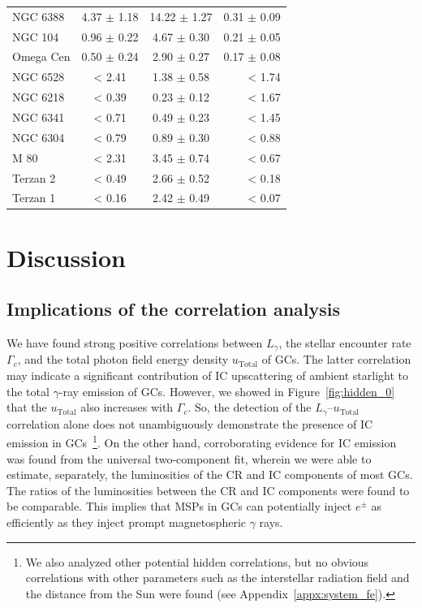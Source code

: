 \documentclass[doublespace,draft,nopageskip]{VTthesis} %
\begin{document}
\begin{table}
\begin{tabular}{lccr}
NGC 6388 & 4.37 $\pm$ 1.18 & 14.22 $\pm$ 1.27 & 0.31 $\pm$ 0.09 \\
NGC 104 & 0.96 $\pm$ 0.22 & 4.67 $\pm$ 0.30 & 0.21 $\pm$ 0.05 \\
Omega Cen & 0.50 $\pm$ 0.24 & 2.90 $\pm$ 0.27 & 0.17 $\pm$ 0.08 \\
NGC 6528 & < 2.41 & 1.38 $\pm$ 0.58 & < 1.74 \\
NGC 6218 & < 0.39  &  0.23 $\pm$ 0.12 & < 1.67 \\
NGC 6341 & < 0.71  &  0.49 $\pm$ 0.23 & < 1.45 \\
NGC 6304 & < 0.79  &  0.89 $\pm$ 0.30 & < 0.88 \\
M 80 & < 2.31  &  3.45 $\pm$ 0.74 & < 0.67 \\
Terzan 2 & < 0.49  &  2.66 $\pm$ 0.52 & < 0.18 \\
Terzan 1 & < 0.16  &  2.42 $\pm$ 0.49 & < 0.07 \\
\hline
    \end{tabular}
    \label{tab:ratio}
\end{table}

\section{Discussion}\label{sec:discussion}

\subsection{Implications of the correlation analysis}

We have found strong positive correlations between $L_\gamma$, the stellar encounter rate $\Gamma_c$, and the total photon field energy density $u_\mathrm{Total}$ of GCs. The latter correlation may indicate a significant contribution of IC upscattering of ambient starlight to the total $\gamma$-ray emission of GCs. However, we showed in Figure~\ref{fig:hidden_0} that the $u_\mathrm{Total}$ also increases with $\Gamma_c$. So, the detection of the $L_\gamma$--$u_\mathrm{Total}$ correlation alone does not unambiguously demonstrate the presence of IC emission in GCs~\footnote{We also analyzed other potential hidden correlations, but no obvious correlations with other parameters such as the interstellar radiation field and the distance from the Sun were found (see Appendix~\ref{appx:system_fe}).}. On the other hand, corroborating evidence for IC emission was found from the universal two-component fit, wherein we were able to estimate, separately, the luminosities of the CR and IC components of most GCs. The ratios of the luminosities between the CR and IC components were found to be comparable. This implies that MSPs in GCs can potentially inject $e^{\pm}$ as efficiently as they inject prompt magnetospheric $\gamma$ rays.
\end{document}
